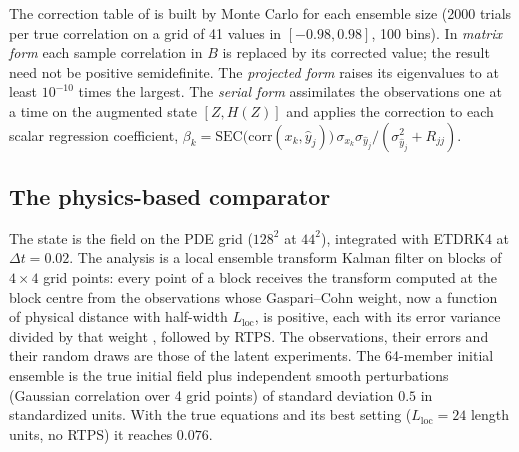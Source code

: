  The correction table of
\citet{anderson2012} is built by Monte Carlo for each ensemble size
(2000 trials per true correlation on a grid of 41 values in
$[-0.98,0.98]$, 100 bins). In \emph{matrix form} each sample correlation in
$B$ is replaced by its corrected value; the result need not be positive
semidefinite. The \emph{projected form} raises its eigenvalues to at
least $10^{-10}$ times the largest. The \emph{serial form} assimilates the
observations one at a time on the augmented state $[Z,H(Z)]$ and applies
the correction to each scalar regression coefficient,
$\beta_k=\mathrm{SEC}\big(\mathrm{corr}(x_k,\hat y_j)\big)\,\sigma_{x_k}\sigma_{\hat y_j}/(\sigma^2_{\hat y_j}+R_{jj})$.

\subsection{The physics-based comparator}
\label{app:da_comparator}

 The state is the field on the PDE grid ($128^2$ at $44^2$), integrated with ETDRK4 at
$\Delta t=0.02$. The analysis is a local ensemble transform Kalman filter on blocks of $4\times4$ grid
points: every point of a block receives the transform computed at the block centre from the
observations whose Gaspari--Cohn weight, now a function of physical distance with half-width $L_{\mathrm{loc}}$, is
positive, each with its error variance divided by that weight \citep{hunt2007}, followed by RTPS. The
observations, their errors and their random draws are those of the latent experiments. The
64-member initial ensemble is the true initial field plus independent smooth perturbations (Gaussian
correlation over 4 grid points) of standard deviation $0.5$ in standardized units. With the true
equations and its best setting ($L_{\mathrm{loc}}=24$ length units, no RTPS) it reaches $0.076$.

